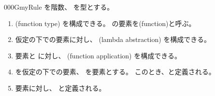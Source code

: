 \documentclass[index]{subfiles}
\begin{document}
\begin{myBlock}{000G}{myRule}
  を階数、
  を型とする。
  \begin{enumerate}
  \item {}(function type)
    を構成できる。
    の要素を(function)と呼ぶ。
  \item 仮定の下での要素に対し、
    (lambda abstraction)
    を構成できる。
  \item 要素と
    に対し、
    (function application)
    を構成できる。
  \item {}を仮定の下での要素、
    を要素とする。
    このとき、と定義される。
  \item 要素に対し、
    と定義される。
  \end{enumerate}
\end{myBlock}
\end{document}

